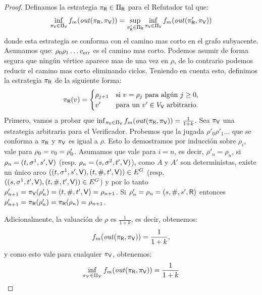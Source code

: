 \begin{proof}
	Definamos la estrategia $\pi_{\mathsf{R}} \in \Pi_{\mathsf{R}}$ para el Refutador tal que:
\[
	\inf_{\pi_{\mathsf{V}} \in \Pi_{\mathsf{V}}} f_m(\mathit{out}(\pi_{\mathsf{R}}, \pi_{\mathsf{V}})) = \sup_{\pi_{\mathsf{R}}' \in \Pi_{\mathsf{R}}} \inf_{\pi_{\mathsf{V}} \in \Pi_{\mathsf{V}}} f_m( \mathit{out}(\pi_{\mathsf{R}}',\pi_{\mathsf{V}}))
\]	
	donde esta estrategia se conforma con el camino mas corto en el grafo subyacente. Asumamos que: 
$\rho_0 \rho_1 \dots v_{\text{err}}$ es el camino mas corto. Podemos asumir de forma segura que ningún vértice aparece mas de una vez en $\rho$, de lo contrario podemos reducir el camino mas corto eliminando ciclos.
	Teniendo en cuenta esto, definimos la estrategia $\pi_{\mathsf{R}}$ de la siguiente forma:
\[
	\pi_{\mathsf{R}}(v) = \begin{cases}
								\rho_{j+1} & \text{si $v = \rho_j$ para algún $j \geq 0$,} \\
								v' & \text{para un $v' \in V_{\mathsf{V}}$ arbitrario.}
						   \end{cases}
\] 
Primero, vamos a probar que $\inf_{\pi_{\mathsf{V}} \in \Pi_{\mathsf{V}}} f_m (\mathit{out}(\pi_{\mathsf{R}}, \pi_{\mathsf{V}})) = \frac{1}{1+k}$. Sea $\pi_{\mathsf{V}}$ una estrategia arbitraria para el Verificador. Probemos que la jugada $\rho'_0 \rho'_1 \dots$ que se conforma a $\pi_{\mathsf{R}}$ y $\pi_{\mathsf{V}}$ es igual a $\rho$. Esto lo demostramos por inducción sobre $\rho_i$, vale para $\rho_0 = v_0 = \rho'_0$. Asumamos que vale para $i=n$, es decir, $\rho'_n = \rho_n$, si $\rho_n = (t, \sigma^1, s', \mathsf{V})$ (resp.  $\rho_n = (s, \sigma^2, t', \mathsf{V})$), como $A$ y $A'$ son deterministas, existe un único arco $((t, \sigma^1, s', \mathsf{V}), (t, \#, t', \mathsf{V})) \in E^G$ (resp. $((s, \sigma^1, t', \mathsf{V}), (t, \#, t', \mathsf{V})) \in E^G$) y por lo tanto  $\rho'_{n+1} = \pi_{\mathsf{V}}( \rho'_n) = (t, \#, t', \mathsf{V}) = \rho_{n+1}$. Si 
$\rho'_n = \rho_n = (s, \#, s', \mathsf{R})$ entonces $\rho'_{n+1} = \pi_{\mathsf{R}}(\rho'_n) = \pi_{\mathsf{R}}(\rho_n) = \rho_{n+1}$. 
	
Adicionalmente, la valuación de $\rho$ es $\frac{1}{1+k}$, es decir, obtenemos:
\begin{equation} \label{eq1}
\begin{split}
 f_m (\mathit{out}(\pi_{\mathsf{R}}, \pi_{\mathsf{V}}))  =  \frac{1}{1+k},
\end{split}
\end{equation}	
y como esto vale para cualquier $\pi_{\mathsf{V}}$, obtenemos:
\begin{equation} \label{eq2}
\begin{split}
\inf_{\pi_V \in \Pi_V} f_m (\mathit{out}(\pi_{\mathsf{R}}, \pi_{\mathsf{V}}))  =  \frac{1}{1+k}
\end{split}
\end{equation}


\end{proof}

